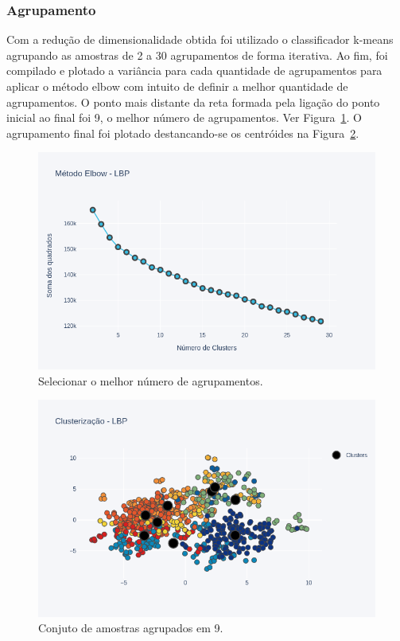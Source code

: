\documentclass[a4paper, 12 pt, conference]{ieeeconf}  %
\begin{document}
\subsubsection{Agrupamento}
Com a redução de dimensionalidade obtida foi utilizado o classificador k-means agrupando as amostras de 2 a 30 agrupamentos de forma iterativa. Ao fim, foi compilado e plotado a variância para cada quantidade de agrupamentos para aplicar o método elbow com intuito de definir a melhor quantidade de agrupamentos. O ponto mais distante da reta formada pela ligação do ponto inicial ao final foi 9, o melhor número de agrupamentos. Ver Figura~\ref{fig:points_elbow_lbp}. O agrupamento final foi plotado destancando-se os centróides na Figura~\ref{fig:scatter_k9_lbp}.

\begin{figure}[!htbp]
	\centering
	\includegraphics[width=1.0\linewidth,clip=true,trim=0cm 0cm 0cm 0cm, keepaspectratio=true]{points_elbow_lbp.png}
	\caption{Selecionar o melhor número de agrupamentos.}
	\label{fig:points_elbow_lbp}
\end{figure}

\begin{figure}[!htbp]
	\centering
	\includegraphics[width=1.0\linewidth,clip=true,trim=0cm 0cm 0cm 0cm, keepaspectratio=true]{scatter_k9_lbp.png}
	\caption{Conjuto de amostras agrupados em 9.}
	\label{fig:scatter_k9_lbp}
\end{figure}
\end{document}
